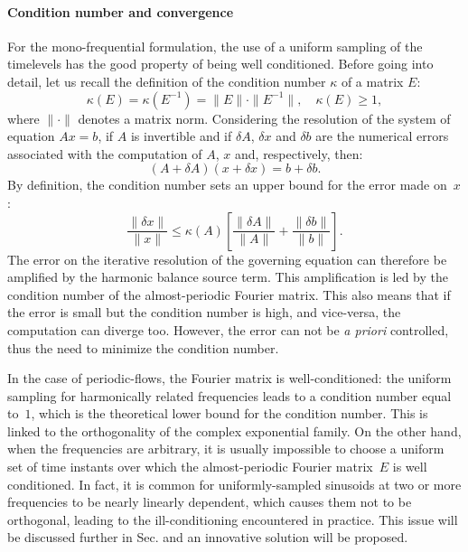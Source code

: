 \paragraph{Condition number and convergence}
For the mono-frequential formulation, the use of a uniform
sampling of the timelevels has the good property of being
well conditioned.
Before going into detail, let us recall the definition of the
condition number $\kappa$ of a matrix $E$:
\begin{equation}
	\kappa (E) = \kappa (E^{-1}) = \| E \| \cdot \| E^{-1} \|, \quad
    \kappa(E) \geq 1,
\end{equation}
where $\| \cdot \|$ denotes a matrix norm.  Considering the resolution
of the system of equation
$A x = b$, if $A$ is invertible and if $\delta A$, $\delta x$ and
$\delta b$ are the numerical errors associated with the computation of
$A$, $x$ and, respectively, then:
\begin{equation}
   (A + \delta A)(x + \delta x) = b + \delta b.
   \label{eq:error_reso}
\end{equation}
By definition, the condition number sets an upper bound for 
the error made on~$x$:
\begin{equation}
   \frac{\| \delta x \|}{\| x \|} \leq 
   \kappa(A)\left[\frac{\| \delta A \|}{\| A \|} + 
   \frac{\| \delta b \|}{\| b \|} \right].
   \label{eq:conditonnig_amp}
\end{equation}
The error on the iterative resolution of the governing equation can
therefore be amplified by the harmonic balance source term. 
This amplification is
led by the condition number of the almost-periodic Fourier matrix. This
also means that if the error is small but the condition number is
high, and vice-versa, the computation can diverge too. However, the
error can not be \emph{a priori} controlled, thus the need to
minimize the condition number.

In the case of periodic-flows, the Fourier matrix is well-conditioned: the
uniform sampling for harmonically related frequencies leads to a
condition number equal to~$1$, which is the theoretical lower bound
for the condition number.  This is linked to the orthogonality of the
complex exponential family.  On the other hand, when the frequencies are arbitrary, it is usually
impossible to choose a uniform set of time instants over which the
almost-periodic Fourier matrix~$E$ is well conditioned. In fact, it is common for uniformly-sampled
sinusoids at two or more frequencies to be nearly linearly dependent,
which causes them not to be orthogonal, leading to the
ill-conditioning encountered in practice. This issue will be discussed
further in Sec. and an innovative
solution will be proposed.

